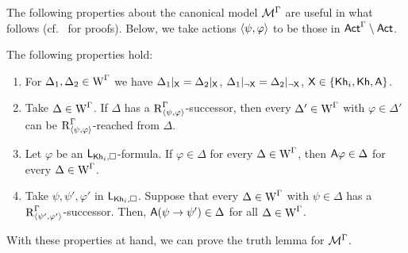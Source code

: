 
The following properties about the canonical model $\mathcal{M}^\Gamma$ are useful in what follows (cf.~\cite{Wang2016,AFSVQ23report} for proofs). Below, we take actions $\langle \psi,\varphi \rangle$ to be those in ${\rm \sf Act}^\Gamma \setminus {\rm \sf Act}$.

\medskip

\begin{proposition} \label{pro:canonical} The following properties hold:
	\begin{enumerate}
		\item \label{pro:cm-ults-khiml-allsame}
For $\Delta_1, \Delta_2 \in \operatorname{W}^\Gamma$ we have $\Delta_1|_{{\mathsf{X}}} = \Delta_2|_{{\mathsf{X}}}$, $\Delta_1|_{\lnot{\mathsf{X}}} = \Delta_2|_{\lnot{\mathsf{X}}}$, ${\mathsf{X}} \in \{ {\sf Kh}_i,{\sf Kh},{\sf A} \}$.

\item\label{pro:cm-ults-khiml-oneall}
Take $\Delta \in \operatorname{W}^\Gamma$. If $\Delta$ has a $\operatorname{R}^\Gamma_{\langle \psi,\varphi \rangle}$-successor, then every $\Delta' \in \operatorname{W}^\Gamma$ with $\varphi \in \Delta'$ can be $\operatorname{R}^\Gamma_{\langle \psi,\varphi \rangle}$-reached from $\Delta$.

\item \label{pro:cm-ults-khiml-allall}
Let $\varphi$ be an $\mathsf{L}_{{\sf Kh}_i,\square}$-formula. If $\varphi \in \Delta$ for every $\Delta \in \operatorname{W}^\Gamma$, then ${\sf A}\varphi \in \Delta$ for every $\Delta \in \operatorname{W}^\Gamma$.

\item\label{pro:cm-ults-khiml-succpre}
Take $\psi, \psi', \varphi'$ in $\mathsf{L}_{{\sf Kh}_i,\square}$. Suppose that every $\Delta \in \operatorname{W}^\Gamma$ with $\psi \in \Delta$ has a $\operatorname{R}^{\Gamma}_{\langle \psi',\varphi' \rangle}$-successor. Then, ${\sf A}(\psi \rightarrow \psi') \in \Delta$ for all $\Delta \in \operatorname{W}^\Gamma$.
	\end{enumerate}
\end{proposition}

\medskip

With these properties at hand, we can prove the truth lemma for $\mathcal{M}^\Gamma$.

\medskip

